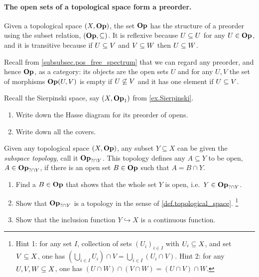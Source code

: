 \documentclass[7Sketches]{subfiles}
\begin{document}
\paragraph{The open sets of a topological space form a preorder.}
%

Given a topological space $(X,\Op)$, the set $\Op$ has the structure of a preorder using the subset relation, $(\Op,\ss)$. It is reflexive because $U\ss U$ for any $U\in\Op$, and it is transitive because if $U\ss V$ and $V\ss W$ then $U\ss W$.

Recall from \cref{subsubsec.pos_free_spectrum} that we can regard any preorder, and hence $\Op$, as a category: its objects are the open sets $U$ and for any $U,V$ the set of morphisms $\Op(U,V)$ is empty if $U\not\ss V$ and it has one element if $U\ss V$.

\begin{exercise}%
\label{exc.opens_Sierp}
Recall the Sierpinski space, say $(X,\Op_1)$ from \cref{ex.Sierpinski}.
\begin{enumerate}
	\item Write down the Hasse diagram for its preorder of opens.
	\item Write down all the covers.
\qedhere
\end{enumerate}
\end{exercise}


\begin{exercise}%
\label{exc.subspace_topology}%
  Given any topological space $(X,\Op)$, any subset $Y\subseteq X$ can be given the
  \emph{subspace topology}, call it $\Op_{?\cap Y}$. This topology defines any $A \subseteq Y$ to be open, $A\in\Op_{?\cap Y}$,
if there is an open set $B\in\Op$ such that $A = B \cap Y$.
\begin{enumerate}
	\item Find a $B\in\Op$ that shows that the whole set $Y$ is open, i.e.\ $Y\in\Op_{?\cap Y}$.
	\item Show that $\Op_{?\cap Y}$ is a topology in the sense of \cref{def.topological_space}.%
	\footnote{Hint 1: for any set $I$, collection of sets $(U_i)_{i\in I}$ with $U_i\ss X$, and set $V\ss X$, one has $\left(\bigcup_{i\in I}U_i\right)\cap V=\bigcup_{i\in I}(U_i\cap V)$. Hint 2: for any $U, V, W\ss X$, one has $(U\cap W)\cap (V\cap W)=(U\cap V)\cap W$.}
	\item Show that the inclusion function $Y \hookrightarrow X$ is a
	  continuous function.
\qedhere
\end{enumerate}
\end{exercise}
\end{document}
